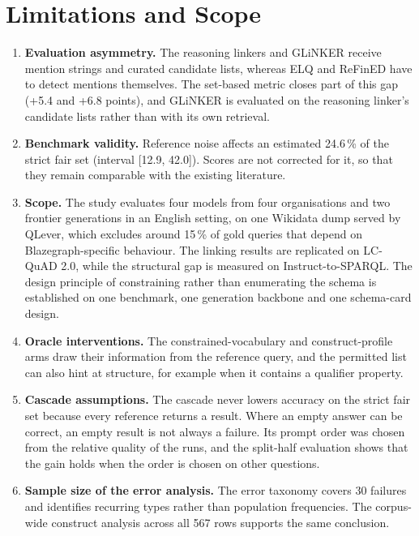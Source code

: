\section{Limitations and Scope}

\label{sec:limitations}

\begin{enumerate}
\def\labelenumi{\arabic{enumi}.}
\item
\textbf{Evaluation asymmetry.}
The reasoning linkers and GLiNKER receive mention strings and curated candidate lists, whereas ELQ and ReFinED have to detect mentions themselves.
The set-based metric closes part of this gap (+5.4 and +6.8 points), and GLiNKER is evaluated on the reasoning linker's candidate lists rather than with its own retrieval.
\item
\textbf{Benchmark validity.}
Reference noise affects an estimated 24.6\,\% of the strict fair set (interval [12.9, 42.0]).
Scores are not corrected for it, so that they remain comparable with the existing literature.
\item
\textbf{Scope.}
The study evaluates four models from four organisations and two frontier generations in an English setting, on one Wikidata dump served by QLever, which excludes around 15\,\% of gold queries that depend on Blazegraph-specific behaviour.
The linking results are replicated on LC-QuAD 2.0, while the structural gap is measured on Instruct-to-SPARQL.
The design principle of constraining rather than enumerating the schema is established on one benchmark, one generation backbone and one schema-card design.
\item
\textbf{Oracle interventions.}
The constrained-vocabulary and construct-profile arms draw their information from the reference query, and the permitted list can also hint at structure, for example when it contains a qualifier property.
\item
\textbf{Cascade assumptions.}
The cascade never lowers accuracy on the strict fair set because every reference returns a result.
Where an empty answer can be correct, an empty result is not always a failure.
Its prompt order was chosen from the relative quality of the runs, and the split-half evaluation shows that the gain holds when the order is chosen on other questions.
\item
\textbf{Sample size of the error analysis.}
The error taxonomy covers 30 failures and identifies recurring types rather than population frequencies.
The corpus-wide construct analysis across all 567 rows supports the same conclusion.
\end{enumerate}
